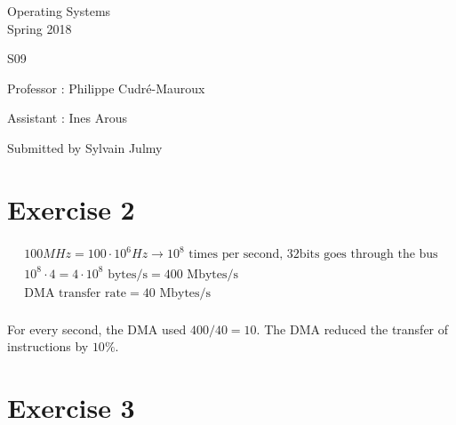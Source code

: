 \documentclass[a4paper,11pt]{report}
\author{Sylvain Julmy}
\date{\today}
\begin{document}
\begin{center}
  \Large{
    Operating Systems\\
    Spring 2018
  }
  
  \noindent\makebox[\linewidth]{\rule{\linewidth}{0.4pt}}
  S09
  \noindent\makebox[\linewidth]{\rule{\linewidth}{0.4pt}}
  \begin{flushleft}
    Professor : Philippe Cudré-Mauroux

    Assistant : Ines Arous
  \end{flushleft}
  
  \noindent\makebox[\linewidth]{\rule{\linewidth}{0.4pt}}

  Submitted by Sylvain Julmy
  
  \noindent\makebox[\linewidth]{\rule{\textwidth}{1pt}}
\end{center}

\section*{Exercise 2}
\begin{gather*}
  100 MHz = 100 \cdot 10^6 Hz \rightarrow \text{$10^8$ times per second, $32$
    bits goes through the bus} \\
  10^8 \cdot 4 = 4\cdot10^8 \text{ bytes/s} = 400 \text{ Mbytes/s} \\
  \text{DMA transfer rate} = 40 \text{ Mbytes/s} \\
\end{gather*}

For every second, the DMA used $400 / 40 = 10$. The DMA reduced the transfer of
instructions by $10\%$.

\section*{Exercise 3}
\end{document}
